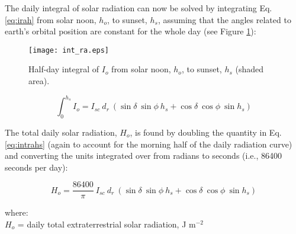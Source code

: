 The daily integral of solar radiation can now be solved by integrating Eq. \ref{eq:irah} from solar noon, $h_o$, to sunset, $h_s$, assuming that the angles related to earth's orbital position are constant for the whole day (see Figure \ref{fig:intra}):

\begin{figure}[ht!]
    \texttt{[image: int\_ra.eps]}
    \caption{Half-day integral of $I_o$ from solar noon, $h_o$, to sunset, $h_s$ (shaded area).}
    \label{fig:intra}
\end{figure}

\begin{equation}
\label{eq:intrahs}
	\int_0^{h_s} I_o = I_{sc}\: d_r\: \left( 
	      \sin\delta\: \sin\phi\: h_s + 
	      \cos\delta\: \cos\phi\: \sin h_s \right)
\end{equation}

\noindent The total daily solar radiation, $H_o$, is found by doubling the quantity in Eq. \ref{eq:intrahs} (again to account for the morning half of the daily radiation curve) and converting the units integrated over from radians to seconds (i.e., 86400 seconds per day):

\begin{equation}
\label{eq:dayra}
	H_o = \frac{86400}{\pi}\: I_{sc}\: d_r\: \left( 
	      \sin\delta\: \sin\phi\: h_s + 
	      \cos\delta\: \cos\phi\: \sin h_s \right)
\end{equation}

\noindent where: \\
\indent $H_o$ = daily total extraterrestrial solar radiation, J m$^{-2}$\\

